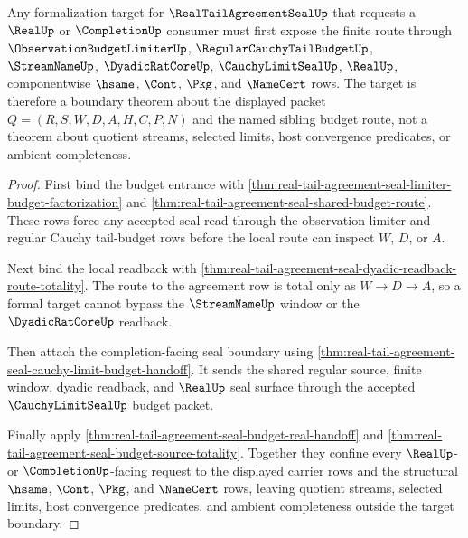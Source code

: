 \begin{theorem}
\label{thm:real-tail-agreement-seal-top-formal-target-boundary}
Any formalization target for $\RealTailAgreementSealUp$ that requests a $\RealUp$ or $\CompletionUp$ consumer must first expose the finite route through $\ObservationBudgetLimiterUp$, $\RegularCauchyTailBudgetUp$, $\StreamNameUp$, $\DyadicRatCoreUp$, $\CauchyLimitSealUp$, $\RealUp$, componentwise $\hsame$, $\Cont$, $\Pkg$, and $\NameCert$ rows. The target is therefore a boundary theorem about the displayed packet $Q=(R,S,W,D,A,H,C,P,N)$ and the named sibling budget route, not a theorem about quotient streams, selected limits, host convergence predicates, or ambient completeness.
\end{theorem}
\begin{proof}
First bind the budget entrance with \autoref{thm:real-tail-agreement-seal-limiter-budget-factorization} and \autoref{thm:real-tail-agreement-seal-shared-budget-route}. These rows force any accepted seal read through the observation limiter and regular Cauchy tail-budget rows before the local route can inspect $W$, $D$, or $A$.

Next bind the local readback with \autoref{thm:real-tail-agreement-seal-dyadic-readback-route-totality}. The route to the agreement row is total only as $W \to D \to A$, so a formal target cannot bypass the $\StreamNameUp$ window or the $\DyadicRatCoreUp$ readback.

Then attach the completion-facing seal boundary using \autoref{thm:real-tail-agreement-seal-cauchy-limit-budget-handoff}. It sends the shared regular source, finite window, dyadic readback, and $\RealUp$ seal surface through the accepted $\CauchyLimitSealUp$ budget packet.

Finally apply \autoref{thm:real-tail-agreement-seal-budget-real-handoff} and \autoref{thm:real-tail-agreement-seal-budget-source-totality}. Together they confine every $\RealUp$- or $\CompletionUp$-facing request to the displayed carrier rows and the structural $\hsame$, $\Cont$, $\Pkg$, and $\NameCert$ rows, leaving quotient streams, selected limits, host convergence predicates, and ambient completeness outside the target boundary.
\end{proof}
